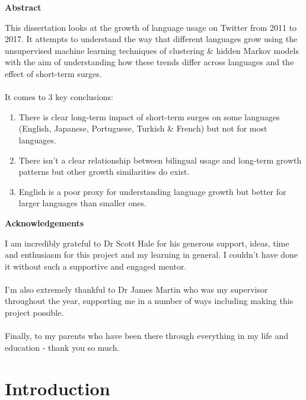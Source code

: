 \documentclass[12pt]{article}
\begin{document}
\begin{center}
\vspace*{2cm}
\textbf{\LARGE Abstract}
\end{center}
 \large This dissertation looks at the growth of language usage on Twitter from 2011 to 2017. It attempts to understand the way that different languages grow using the unsupervised machine learning techniques of clustering \& hidden Markov models with the aim of understanding how these trends differ across languages and the effect of short-term surges.
\\\\
It comes to 3 key conclusions:
\begin{enumerate}
\item There is  clear long-term impact of short-term surges on some languages (English, Japanese, Portuguese, Turkish \& French) but not for most languages.
\item There isn't a clear relationship between bilingual usage and long-term growth patterns but other growth similarities do exist.
\item English is a poor proxy for understanding language growth but better for larger languages than smaller ones.
\end{enumerate}
 \newpage
 
\begin{center}
\vspace*{2cm}
\textbf{\LARGE Acknowledgements}
\end{center}
 \large I am incredibly grateful to Dr Scott Hale for his generous support, ideas, time and enthusiasm for this project and my learning in general. I couldn't have done it without such a supportive and engaged mentor.
 \\\\
 I'm also extremely thankful to Dr James Martin who was my supervisor throughout the year, supporting me in a number of ways including making this project possible.
 \\\\
 Finally, to my parents who have been there through everything in my life and education - thank you so much.
 \newpage
 
\tableofcontents

\newpage

\section{Introduction}
\end{document}
